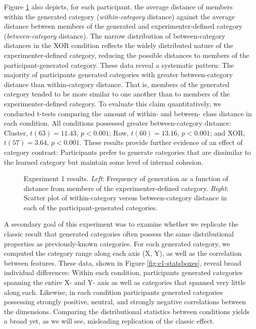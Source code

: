 \documentclass[12pt]{article}
\newcommand\inputpgf[2]{{
\let\pgfimageWithoutPath\pgfimage
\renewcommand{\pgfimage}[2][]{\pgfimageWithoutPath[##1]{#1/##2}}

}}
\begin{document}
\begin{flushleft}
Figure \ref{fig:e1-distanceplots} also depicts, for each participant, the
average distance of members within the generated category ({\em within-category}
distance) against the average distance between members of the generated and
experimenter-defined category ({\em between-category} distance). The narrow
distribution of between-category distances in the XOR condition reflects the
widely distributed nature of the experimenter-defined category, reducing the
possible distances to members of the participant-generated category. These data
reveal a systematic pattern: The majority of participants generated categories
with greater between-category distance than within-category distance. That is,
members of the generated category tended to be more similar to one another than
to members of the experimenter-defined category. To evaluate this claim
quantitatively, we conducted t-tests comparing the amount of within- and
between- class distance in each condition. All conditions possessed greater
between-category distance: Cluster, $t(63) = 11.43$, $p < 0.001$; Row, $t(60) =
13.16$, $p < 0.001$; and XOR, $t(57) = 3.64$, $p < 0.001$. These results provide
further evidence of an effect of category contrast: Participants prefer to
generate categories that are dissimilar to the learned category but maintain
some level of internal cohesion.

\begin{figure}
    \begin{center} \inputpgf{figs/}{e1-distanceplots.pgf}
    \caption{Experiment 1 results. {\em Left}: Frequency of generation as a
function of distance from members of the experimenter-defined category. {\em
Right}: Scatter plot of within-category versus between-category distance in each
of the participant-generated categories.}
    \label{fig:e1-distanceplots}
    \end{center}
\end{figure}

A secondary goal of this experiment was to examine whether we replicate the
classic result that generated categories often possess the same distributional
properties as previously-known categories. For each generated category, we
computed the category range along each axis (X, Y), as well as the correlation
between features. These data, shown in Figure \ref{fig:e1-statsboxes}, reveal
broad individual differences: Within each condition, participants generated
categories spanning the entire X- and Y- axis as well as categories that spanned
very little along each. Likewise, in each condition participants generated
categories possessing strongly positive, neutral, and strongly negative
correlations between the dimensions. Comparing the distributional statistics
between conditions yields a broad yet, as we will see, misleading replication of
the classic effect.


\end{flushleft}
\end{document}
